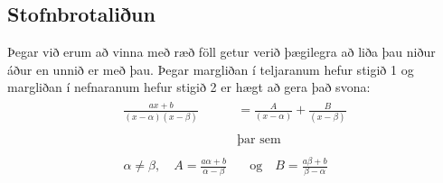 \documentclass[a4paper,10pt,icelandic]{sphinxmanual}
\begin{document}
\subsection{Stofnbrotaliðun}
\label{\detokenize{Kafli09:stofnbrotaliun}}
Þegar við erum að vinna með ræð föll getur verið þægilegra að liða þau niður áður en unnið er með þau.
Þegar margliðan í teljaranum hefur stigið 1 og margliðan í nefnaranum hefur stigið 2 er hægt að gera það svona:
\begin{equation*}
\begin{split}\begin{aligned}
\frac{ax+b}{(x-\alpha)(x-\beta)} &= \frac{A}{(x-\alpha)}+ \frac{B}{(x-\beta)} \\
\quad \\
&\text{þar sem} \\ \quad \\
\alpha \neq \beta, \quad A= \frac{a\alpha + b}{\alpha - \beta} & \quad \text{og} \quad B= \frac{a\beta + b}{\beta - \alpha} \\
\end{aligned}\end{split}
\end{equation*}
\end{document}
